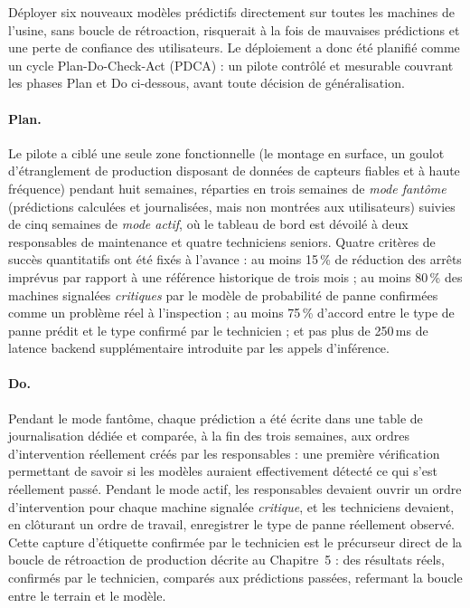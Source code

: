 Déployer six nouveaux modèles prédictifs directement sur toutes les machines de l'usine, sans boucle de rétroaction, risquerait à la fois de mauvaises prédictions et une perte de confiance des utilisateurs. Le déploiement a donc été planifié comme un cycle Plan-Do-Check-Act (PDCA) : un pilote contrôlé et mesurable couvrant les phases Plan et Do ci-dessous, avant toute décision de généralisation.

\paragraph{Plan.} Le pilote a ciblé une seule zone fonctionnelle (le montage en surface, un goulot d'étranglement de production disposant de données de capteurs fiables et à haute fréquence) pendant huit semaines, réparties en trois semaines de \emph{mode fantôme} (prédictions calculées et journalisées, mais non montrées aux utilisateurs) suivies de cinq semaines de \emph{mode actif}, où le tableau de bord est dévoilé à deux responsables de maintenance et quatre techniciens seniors. Quatre critères de succès quantitatifs ont été fixés à l'avance : au moins 15\,\% de réduction des arrêts imprévus par rapport à une référence historique de trois mois ; au moins 80\,\% des machines signalées \emph{critiques} par le modèle de probabilité de panne confirmées comme un problème réel à l'inspection ; au moins 75\,\% d'accord entre le type de panne prédit et le type confirmé par le technicien ; et pas plus de 250\,ms de latence backend supplémentaire introduite par les appels d'inférence.

\paragraph{Do.} Pendant le mode fantôme, chaque prédiction a été écrite dans une table de journalisation dédiée et comparée, à la fin des trois semaines, aux ordres d'intervention réellement créés par les responsables : une première vérification permettant de savoir si les modèles auraient effectivement détecté ce qui s'est réellement passé. Pendant le mode actif, les responsables devaient ouvrir un ordre d'intervention pour chaque machine signalée \emph{critique}, et les techniciens devaient, en clôturant un ordre de travail, enregistrer le type de panne réellement observé. Cette capture d'étiquette confirmée par le technicien est le précurseur direct de la boucle de rétroaction de production décrite au Chapitre~5 : des résultats réels, confirmés par le technicien, comparés aux prédictions passées, refermant la boucle entre le terrain et le modèle.

